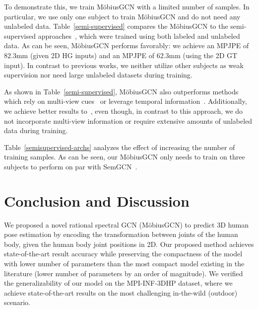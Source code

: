 \documentclass[runningheads]{llncs}
\begin{document}
To demonstrate this, we train M\"obiusGCN with a limited number of samples. In particular, we use only one subject to train M\"obiusGCN and do not need any unlabeled data.
Table~\ref{semi-supervised} compares the M\"obiusGCN to the semi-supervised approaches~\cite{rhodin2018unsupervised, chen2019weakly,pavlakos2019texturepose,li2019boosting, iqbal2020weakly}, which were trained using both labeled and unlabeled data.
As can be seen, M\"obiusGCN performs favorably: we achieve an MPJPE of $82.3 \text{mm}$ (given 2D HG inputs) and an MPJPE of $62.3 \text{mm}$ (using the 2D GT input). In contrast to previous works, we neither utilize other subjects as weak supervision nor need large unlabeled datasets during training. 

As shown in Table~\ref{semi-supervised}, M\"obiusGCN also outperforms methods which rely on multi-view cues~\cite{rhodin2018unsupervised, chen2019weakly} or leverage temporal information~\cite{li2019boosting}.
Additionally, we achieve better results to~\cite{iqbal2020weakly}, even though, in contrast to this approach, we do not incorporate multi-view information or require extensive amounts of unlabeled data during training.

Table~\ref{semisupervised-archs} analyzes the effect of increasing the number of training samples.
As can be seen, our M\"obiusGCN only needs to train on three subjects to perform on par with SemGCN~\cite{zhaoCVPR19semantic}.
\vspace{-5px}
\begin{center}
\label{semisupervised-archs}
 \end{center}
\vspace{-17px}
\section{Conclusion and Discussion}
\vspace{-5px}
We proposed a novel rational spectral GCN (M\"obiusGCN) to predict 3D human pose estimation by encoding the transformation between joints of the human body, given the human body joint positions in 2D. Our proposed method achieves state-of-the-art result accuracy while preserving the compactness of the model with lower number of parameters than the most compact model existing in the literature (lower number of parameters by an order of magnitude).
We verified the generalizability of our model on the MPI-INF-3DHP dataset, where we achieve state-of-the-art results on the most challenging in-the-wild (outdoor) scenario.
\end{document}
